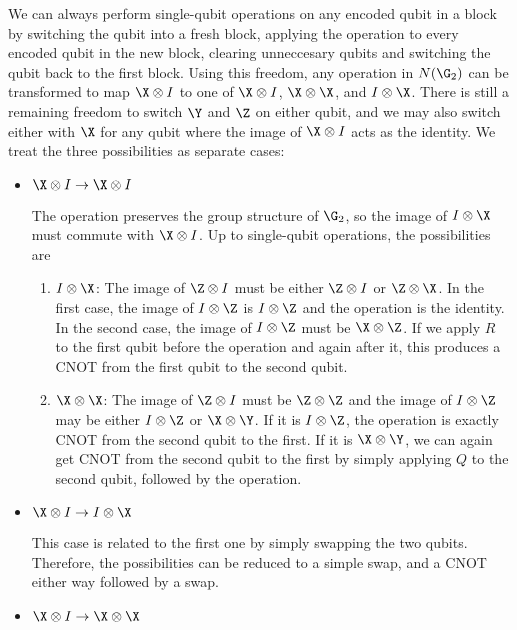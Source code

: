 We can always perform single-qubit operations on any encoded qubit in a
block by switching the qubit into a fresh block, applying the operation to
every encoded qubit in the new block, clearing unneccesary qubits and
switching the qubit back to the first block.  Using this freedom, any
operation in $N(\G_2)$ can be transformed to map $\X \otimes I$ to one of
$\X \otimes I$, $\X \otimes \X$, and $I \otimes \X$.  There is still a
remaining freedom to switch $\Y$ and $\Z$ on either qubit, and we may
also switch either with $\X$ for any qubit where the image of $\X \otimes
I$ acts as the identity.  We treat the three possibilities as separate cases:
\begin{itemize}
	\item $\X \otimes I \rightarrow \X \otimes I$

	The operation preserves the group structure of $\G_2$, so the image of $I
	\otimes \X$ must commute with $\X \otimes I$.  Up to single-qubit
	operations, the possibilities are

	\begin{enumerate}
		\item $I \otimes \X$: The image of $\Z \otimes I$ must be either $\Z
		\otimes I$ or $\Z \otimes \X$.  In the first case, the image of $I \otimes
		\Z$ is $I \otimes \Z$ and the operation is the identity.  In the second case,
		the image of $I \otimes \Z$ must be $\X \otimes \Z$.  If we apply $R$ to
		the first qubit before the operation and again after it, this produces a CNOT
		from the first qubit to the second qubit.

		\item $\X \otimes \X$: The image of $\Z \otimes I$ must be $\Z \otimes
		\Z$ and the image of $I \otimes \Z$ may be either $I \otimes \Z$ or $\X
		\otimes \Y$.  If it is $I \otimes \Z$, the operation is exactly CNOT from the
		second qubit to the first.  If it is $\X \otimes \Y$, we can again get CNOT
		from the second qubit to the first by simply applying $Q$ to the second
		qubit, followed by the operation.
	\end{enumerate}

	\item $\X \otimes I \rightarrow I \otimes \X$

	This case is related to the first one by simply swapping the two qubits.
	Therefore, the possibilities can be reduced to a simple swap, and a CNOT
	either way followed by a swap.

	\item $\X \otimes I \rightarrow \X \otimes \X$


\end{itemize}
